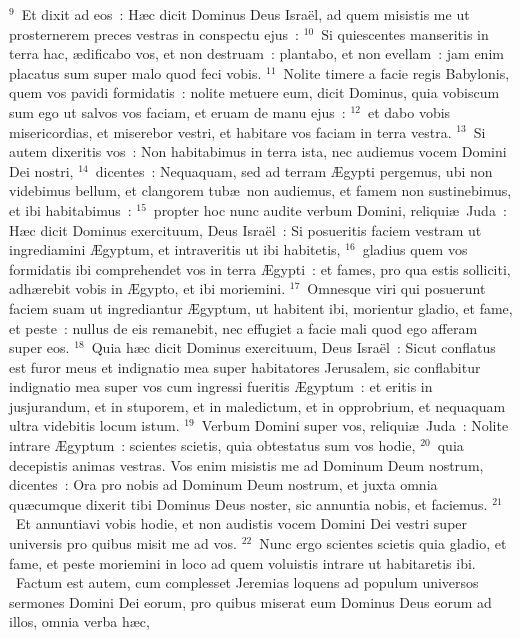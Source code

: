 ${}^{9}$~Et dixit ad eos~: H\ae c dicit Dominus Deus Isra\"el, ad quem misistis me ut prosternerem preces vestras in conspectu ejus~:
${}^{10}$~Si quiescentes manseritis in terra hac, \ae dificabo vos, et non destruam~: plantabo, et non evellam~: jam enim placatus sum super malo quod feci vobis.
${}^{11}$~Nolite timere a facie regis Babylonis, quem vos pavidi formidatis~: nolite metuere eum, dicit Dominus, quia vobiscum sum ego ut salvos vos faciam, et eruam de manu ejus~:
${}^{12}$~et dabo vobis misericordias, et miserebor vestri, et habitare vos faciam in terra vestra.
${}^{13}$~Si autem dixeritis vos~: Non habitabimus in terra ista, nec audiemus vocem Domini Dei nostri,
${}^{14}$~dicentes~: Nequaquam, sed ad terram \AE gypti pergemus, ubi non videbimus bellum, et clangorem tub\ae\ non audiemus, et famem non sustinebimus, et ibi habitabimus~:
${}^{15}$~propter hoc nunc audite verbum Domini, reliqui\ae\ Juda~: H\ae c dicit Dominus exercituum, Deus Isra\"el~: Si posueritis faciem vestram ut ingrediamini \AE gyptum, et intraveritis ut ibi habitetis,
${}^{16}$~gladius quem vos formidatis ibi comprehendet vos in terra \AE gypti~: et fames, pro qua estis solliciti, adh\ae rebit vobis in \AE gypto, et ibi moriemini.
${}^{17}$~Omnesque viri qui posuerunt faciem suam ut ingrediantur \AE gyptum, ut habitent ibi, morientur gladio, et fame, et peste~: nullus de eis remanebit, nec effugiet a facie mali quod ego afferam super eos.
${}^{18}$~Quia h\ae c dicit Dominus exercituum, Deus Isra\"el~: Sicut conflatus est furor meus et indignatio mea super habitatores Jerusalem, sic conflabitur indignatio mea super vos cum ingressi fueritis \AE gyptum~: et eritis in jusjurandum, et in stuporem, et in maledictum, et in opprobrium, et nequaquam ultra videbitis locum istum.
${}^{19}$~Verbum Domini super vos, reliqui\ae\ Juda~: Nolite intrare \AE gyptum~: scientes scietis, quia obtestatus sum vos hodie,
${}^{20}$~quia decepistis animas vestras. Vos enim misistis me ad Dominum Deum nostrum, dicentes~: Ora pro nobis ad Dominum Deum nostrum, et juxta omnia qu\ae cumque dixerit tibi Dominus Deus noster, sic annuntia nobis, et faciemus.
${}^{21}$~Et annuntiavi vobis hodie, et non audistis vocem Domini Dei vestri super universis pro quibus misit me ad vos.
${}^{22}$~Nunc ergo scientes scietis quia gladio, et fame, et peste moriemini in loco ad quem voluistis intrare ut habitaretis ibi.
~\lettrine[lines=10,image=true,loversize=0.05,lraise=-0.03]{F}{}actum est autem, cum complesset Jeremias loquens ad populum universos sermones Domini Dei eorum, pro quibus miserat eum Dominus Deus eorum ad illos, omnia verba h\ae c,
